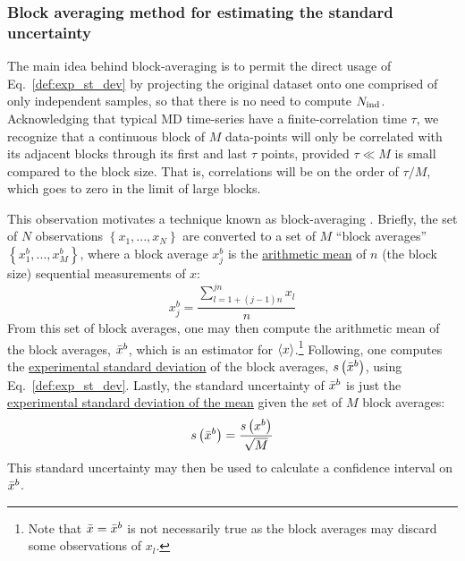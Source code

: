 \subsubsection{Block averaging method for estimating the standard uncertainty}\label{sec:blockavg}

The main idea behind block-averaging is to permit the direct usage of Eq.~\eqref{def:exp_st_dev} by projecting the original dataset onto one comprised of only independent samples, so that there is no need to compute $N_{\rm ind}$.  Acknowledging that typical MD time-series have a finite-correlation time $\tau$, we recognize that a continuous block of $M$ data-points will only be correlated with its adjacent blocks through its first and last $\tau$ points, provided $\tau \ll M$ is small compared to the block size.   That is, correlations will be on the order of $\tau / M$, which goes to zero in the limit of large blocks.

This observation motivates a technique known as block-averaging \cite{Friedberg1970,Flyvbjerg-1989,FrenkelSmit2002,Grossfield2009}.
Briefly, the set of $N$ observations $\left\{x_1, ..., x_N\right\}$ are converted to a set of $M$ ``block averages'' $\left\{x^b_1, ..., x^b_{M}\right\}$, where a block average $x^b_j$ is the \hyperref[def:arith_mean]{arithmetic mean} of $n$ (the block size) sequential measurements of $x$:
%
\begin{equation}
  x^b_j = \dfrac{\sum\limits_{l=1+(j-1)n}^{jn} x_l}{n}
\end{equation}
%
From this set of block averages, one may then compute the arithmetic mean of the block averages, $\bar{x}^b$, which is an estimator for $\langle x \rangle$.\footnote{Note that $\bar{x} = \bar{x}^b$ is not necessarily true as the block averages may discard some observations of $x_l$.}
Following, one computes the \hyperref[def:exp_st_dev]{experimental standard deviation} of the block averages, $s\left( \bar{x}^b \right)$, using Eq.~\ref{def:exp_st_dev}.
Lastly, the standard uncertainty of $\bar{x}^b$ is just the \hyperref[def:exp_st_dev_mean]{experimental standard deviation of the mean} given the set of $M$ block averages:
%
\begin{equation}
  s\left( \bar{x}^b \right) = \dfrac{s\left( x^b \right)}{\sqrt{M}}
\end{equation}
%
This standard uncertainty may then be used to calculate a confidence interval on $\bar{x}^b$.

